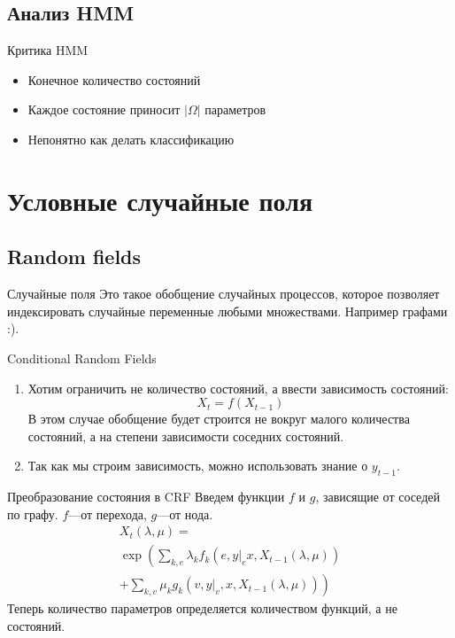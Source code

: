 \documentclass[14pt, fleqn, xcolor={dvipsnames, table}]{beamer}
\begin{document}
\subsection{Анализ HMM}
\begin{frame}{Критика HMM}
\begin{itemize}
  \item Конечное количество состояний
  \item Каждое состояние приносит $|\Omega|$ параметров
  \item Непонятно как делать классификацию
\end{itemize}
\end{frame}

\section{Условные случайные поля}

\subsection{Random fields}

\begin{frame}{Случайные поля}
Это такое обобщение случайных процессов, которое позволяет индексировать случайные переменные любыми множествами. Например графами :).
\end{frame}

\begin{frame}{Conditional Random Fields}
\begin{enumerate}
  \item Хотим ограничить не количество состояний, а ввести зависимость состояний:
$$X_t = f(X_{t-1})$$
В этом случае обобщение будет строится не вокруг малого количества состояний, а на степени зависимости соседних состояний.
  \item Так как мы строим зависимость, можно использовать знание о $y_{t-1}$.
\end{enumerate}
\end{frame}

\begin{frame}{Преобразование состояния в CRF}
Введем функции $f$ и $g$, зависящие от соседей по графу. $f$---от перехода, $g$---от нода.
{\small
$$\begin{array}{c}
X_t(\lambda, \mu) = \\ 
\exp\left(\sum_{k,e} \lambda_k f_k(e, y|_e x, X_{t - 1}(\lambda, \mu)) \right.\\
\left. + \sum_{k,v} \mu_k g_k(v, y|_v, x, X_{t-1}(\lambda, \mu)) \right)
\end{array}$$
}
Теперь количество параметров определяется количеством функций, а не состояний.
\end{frame}
\end{document}
